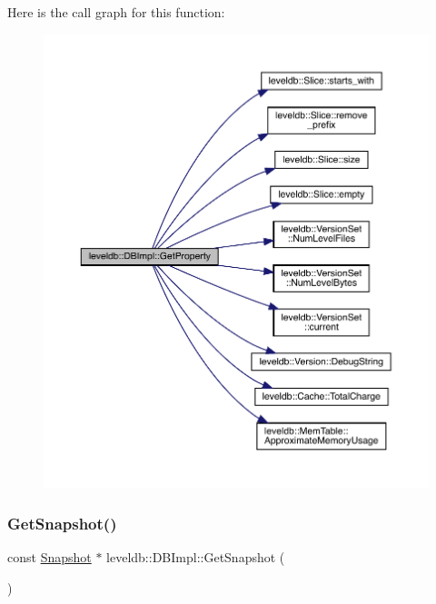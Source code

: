Here is the call graph for this function\+:
\nopagebreak
\begin{figure}[H]
\begin{center}
\leavevmode
\includegraphics[width=350pt]{classleveldb_1_1_d_b_impl_ad1a2023ce171c8f8476664f5b1cbab4d_cgraph}
\end{center}
\end{figure}
\mbox{\label{classleveldb_1_1_d_b_impl_a4bec3d8ffd65fec562b2dd1f6eaba137}} 
\subsubsection{\texorpdfstring{GetSnapshot()}{GetSnapshot()}}
{\footnotesize\ttfamily const \mbox{\hyperlink{classleveldb_1_1_snapshot}{Snapshot}} $\ast$ leveldb\+::\+D\+B\+Impl\+::\+Get\+Snapshot (\begin{DoxyParamCaption}{ }\end{DoxyParamCaption})\hspace{0.3cm}{\ttfamily [virtual]}}




